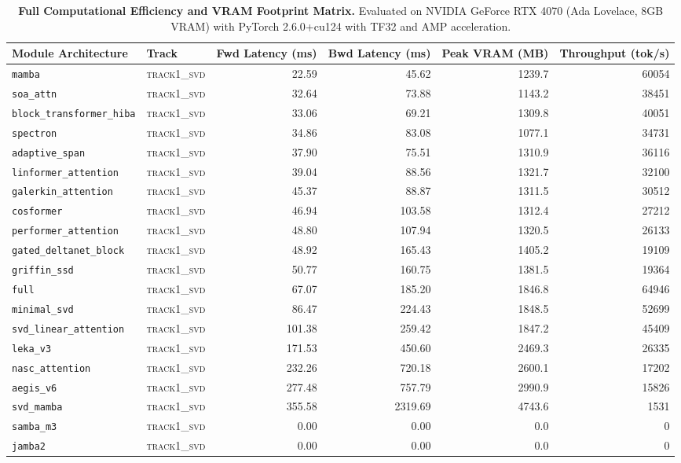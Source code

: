 \begin{table}[t]
\centering
\small
\caption{\textbf{Full Computational Efficiency and VRAM Footprint Matrix.} Evaluated on NVIDIA GeForce RTX 4070 (Ada Lovelace, 8GB VRAM) with PyTorch 2.6.0+cu124 with TF32 and AMP acceleration.}
\label{tab:efficiency_benchmark_results}
\begin{tabular}{l l r r r r}
\toprule
\textbf{Module Architecture} & \textbf{Track} & \textbf{Fwd Latency (ms)} & \textbf{Bwd Latency (ms)} & \textbf{Peak VRAM (MB)} & \textbf{Throughput (tok/s)} \\
\midrule
\texttt{mamba} & \textsc{track1\_svd} & 22.59 & 45.62 & 1239.7 & 60054 \\
\texttt{soa\_attn} & \textsc{track1\_svd} & 32.64 & 73.88 & 1143.2 & 38451 \\
\texttt{block\_transformer\_hiba} & \textsc{track1\_svd} & 33.06 & 69.21 & 1309.8 & 40051 \\
\texttt{spectron} & \textsc{track1\_svd} & 34.86 & 83.08 & 1077.1 & 34731 \\
\texttt{adaptive\_span} & \textsc{track1\_svd} & 37.90 & 75.51 & 1310.9 & 36116 \\
\texttt{linformer\_attention} & \textsc{track1\_svd} & 39.04 & 88.56 & 1321.7 & 32100 \\
\texttt{galerkin\_attention} & \textsc{track1\_svd} & 45.37 & 88.87 & 1311.5 & 30512 \\
\texttt{cosformer} & \textsc{track1\_svd} & 46.94 & 103.58 & 1312.4 & 27212 \\
\texttt{performer\_attention} & \textsc{track1\_svd} & 48.80 & 107.94 & 1320.5 & 26133 \\
\texttt{gated\_deltanet\_block} & \textsc{track1\_svd} & 48.92 & 165.43 & 1405.2 & 19109 \\
\texttt{griffin\_ssd} & \textsc{track1\_svd} & 50.77 & 160.75 & 1381.5 & 19364 \\
\texttt{full} & \textsc{track1\_svd} & 67.07 & 185.20 & 1846.8 & 64946 \\
\texttt{minimal\_svd} & \textsc{track1\_svd} & 86.47 & 224.43 & 1848.5 & 52699 \\
\texttt{svd\_linear\_attention} & \textsc{track1\_svd} & 101.38 & 259.42 & 1847.2 & 45409 \\
\texttt{leka\_v3} & \textsc{track1\_svd} & 171.53 & 450.60 & 2469.3 & 26335 \\
\texttt{nasc\_attention} & \textsc{track1\_svd} & 232.26 & 720.18 & 2600.1 & 17202 \\
\texttt{aegis\_v6} & \textsc{track1\_svd} & 277.48 & 757.79 & 2990.9 & 15826 \\
\texttt{svd\_mamba} & \textsc{track1\_svd} & 355.58 & 2319.69 & 4743.6 & 1531 \\
\texttt{samba\_m3} & \textsc{track1\_svd} & 0.00 & 0.00 & 0.0 & 0 \\
\texttt{jamba2} & \textsc{track1\_svd} & 0.00 & 0.00 & 0.0 & 0 \\
\bottomrule
\end{tabular}
\end{table}